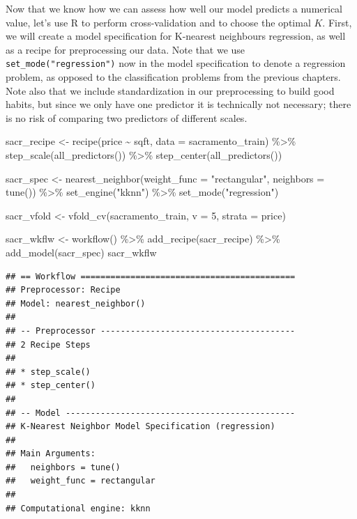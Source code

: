 \documentclass[
]{krantz}
\makeatletter
\newenvironment{Shaded}{\begin{snugshade}}{\end{snugshade}}
\newcommand{\AttributeTok}[1]{\textcolor[rgb]{0.61,0.61,0.61}{#1}}
\newcommand{\DecValTok}[1]{\textcolor[rgb]{0.06,0.06,0.06}{#1}}
\newcommand{\FunctionTok}[1]{\textcolor[rgb]{0,0,0}{#1}}
\newcommand{\NormalTok}[1]{#1}
\newcommand{\OtherTok}[1]{\textcolor[rgb]{0.37,0.37,0.37}{#1}}
\newcommand{\SpecialCharTok}[1]{\textcolor[rgb]{0,0,0}{#1}}
\newcommand{\StringTok}[1]{\textcolor[rgb]{0.5,0.5,0.5}{#1}}
\newenvironment{kframe}{%
\medskip{}
\setlength{\fboxsep}{.8em}
 \def\at@end@of@kframe{}%
 \ifinner\ifhmode%
  \def\at@end@of@kframe{\end{minipage}}%
  \begin{minipage}{\columnwidth}%
 \fi\fi%
 \def\FrameCommand##1{\hskip\@totalleftmargin \hskip-\fboxsep
 \colorbox{shadecolor}{##1}\hskip-\fboxsep
     \hskip-\linewidth \hskip-\@totalleftmargin \hskip\columnwidth}%
 \MakeFramed {\advance\hsize-\width
   \@totalleftmargin\z@ \linewidth\hsize
   \@setminipage}}%
 {\par\unskip\endMakeFramed%
 \at@end@of@kframe}
\renewenvironment{Shaded}{\begin{kframe}}{\end{kframe}}
\makeatother
\begin{document}
Now that we know how we can assess how well our model predicts a numerical
value, let's use R to perform cross-validation and to choose the optimal \(K\).
First, we will create a model specification for K-nearest neighbours regression,
as well as a recipe for preprocessing our data. Note that we use \texttt{set\_mode("regression")}
now in the model specification to denote a regression problem, as opposed to the classification
problems from the previous chapters. Note also that we include standardization
in our preprocessing to build good habits, but since we only have one
predictor it is technically not necessary; there is no risk of comparing two predictors
of different scales.

\begin{Shaded}
\begin{Highlighting}[]
\NormalTok{sacr\_recipe }\OtherTok{\textless{}{-}} \FunctionTok{recipe}\NormalTok{(price }\SpecialCharTok{\textasciitilde{}}\NormalTok{ sqft, }\AttributeTok{data =}\NormalTok{ sacramento\_train) }\SpecialCharTok{\%\textgreater{}\%}
  \FunctionTok{step\_scale}\NormalTok{(}\FunctionTok{all\_predictors}\NormalTok{()) }\SpecialCharTok{\%\textgreater{}\%}
  \FunctionTok{step\_center}\NormalTok{(}\FunctionTok{all\_predictors}\NormalTok{())}

\NormalTok{sacr\_spec }\OtherTok{\textless{}{-}} \FunctionTok{nearest\_neighbor}\NormalTok{(}\AttributeTok{weight\_func =} \StringTok{"rectangular"}\NormalTok{, }\AttributeTok{neighbors =} \FunctionTok{tune}\NormalTok{()) }\SpecialCharTok{\%\textgreater{}\%}
  \FunctionTok{set\_engine}\NormalTok{(}\StringTok{"kknn"}\NormalTok{) }\SpecialCharTok{\%\textgreater{}\%}
  \FunctionTok{set\_mode}\NormalTok{(}\StringTok{"regression"}\NormalTok{)}

\NormalTok{sacr\_vfold }\OtherTok{\textless{}{-}} \FunctionTok{vfold\_cv}\NormalTok{(sacramento\_train, }\AttributeTok{v =} \DecValTok{5}\NormalTok{, }\AttributeTok{strata =}\NormalTok{ price)}

\NormalTok{sacr\_wkflw }\OtherTok{\textless{}{-}} \FunctionTok{workflow}\NormalTok{() }\SpecialCharTok{\%\textgreater{}\%}
  \FunctionTok{add\_recipe}\NormalTok{(sacr\_recipe) }\SpecialCharTok{\%\textgreater{}\%}
  \FunctionTok{add\_model}\NormalTok{(sacr\_spec)}
\NormalTok{sacr\_wkflw}
\end{Highlighting}
\end{Shaded}

\begin{verbatim}
## == Workflow ===========================================
## Preprocessor: Recipe
## Model: nearest_neighbor()
## 
## -- Preprocessor ---------------------------------------
## 2 Recipe Steps
## 
## * step_scale()
## * step_center()
## 
## -- Model ----------------------------------------------
## K-Nearest Neighbor Model Specification (regression)
## 
## Main Arguments:
##   neighbors = tune()
##   weight_func = rectangular
## 
## Computational engine: kknn
\end{verbatim}
\end{document}

